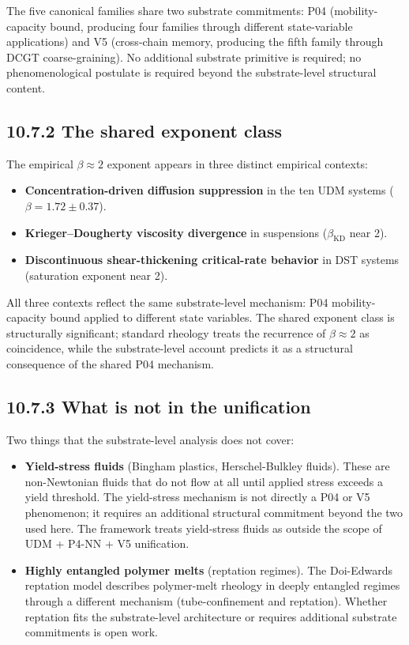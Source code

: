 \documentclass[11pt]{book}
\begin{document}
The five canonical families share two substrate commitments: P04 (mobility-capacity bound, producing four families through different state-variable applications) and V5 (cross-chain memory, producing the fifth family through DCGT coarse-graining). No additional substrate primitive is required; no phenomenological postulate is required beyond the substrate-level structural content.

\subsection{10.7.2 The shared exponent class}

The empirical $\beta \approx 2$ exponent appears in three distinct empirical contexts:

\begin{itemize}
\item \textbf{Concentration-driven diffusion suppression} in the ten UDM systems ($\beta = 1.72 \pm 0.37$).
\item \textbf{Krieger–Dougherty viscosity divergence} in suspensions ($\beta_\mathrm{KD}$ near 2).
\item \textbf{Discontinuous shear-thickening critical-rate behavior} in DST systems (saturation exponent near 2).
\end{itemize}

All three contexts reflect the same substrate-level mechanism: P04 mobility-capacity bound applied to different state variables. The shared exponent class is structurally significant; standard rheology treats the recurrence of $\beta \approx 2$ as coincidence, while the substrate-level account predicts it as a structural consequence of the shared P04 mechanism.

\subsection{10.7.3 What is not in the unification}

Two things that the substrate-level analysis does not cover:

\begin{itemize}
\item \textbf{Yield-stress fluids} (Bingham plastics, Herschel-Bulkley fluids). These are non-Newtonian fluids that do not flow at all until applied stress exceeds a yield threshold. The yield-stress mechanism is not directly a P04 or V5 phenomenon; it requires an additional structural commitment beyond the two used here. The framework treats yield-stress fluids as outside the scope of UDM + P4-NN + V5 unification.
\item \textbf{Highly entangled polymer melts} (reptation regimes). The Doi-Edwards reptation model describes polymer-melt rheology in deeply entangled regimes through a different mechanism (tube-confinement and reptation). Whether reptation fits the substrate-level architecture or requires additional substrate commitments is open work.
\end{itemize}
\end{document}
